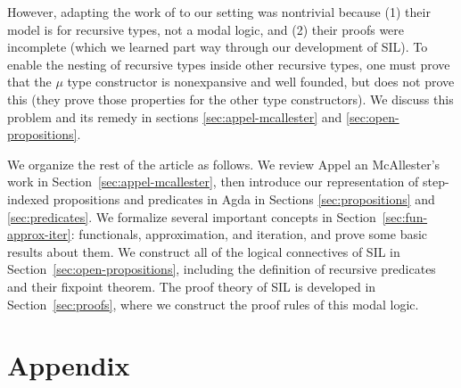 \documentclass[acmsmall]{acmart}
\begin{document}
However, adapting the work of \citet{Appel:2001aa} to our setting was
nontrivial because (1) their model is for recursive types, not a modal
logic, and (2) their proofs were incomplete (which we learned part way
through our development of SIL). To enable the nesting of recursive
types inside other recursive types, one must prove that the $μ$ type
constructor is nonexpansive and well founded, but \citet{Appel:2001aa}
does not prove this (they prove those properties for the other type
constructors).  We discuss this problem and its remedy in sections
\ref{sec:appel-mcallester} and \ref{sec:open-propositions}.

We organize the rest of the article as follows. We review Appel an
McAllester's work in Section~\ref{sec:appel-mcallester}, then
introduce our representation of step-indexed propositions and
predicates in Agda in Sections \ref{sec:propositions} and
\ref{sec:predicates}.  We formalize several important concepts in
Section~\ref{sec:fun-approx-iter}: functionals, approximation, and
iteration, and prove some basic results about them.  We construct all
of the logical connectives of SIL in
Section~\ref{sec:open-propositions}, including the definition of
recursive predicates and their fixpoint theorem.  The proof theory of
SIL is developed in Section~\ref{sec:proofs}, where we construct the
proof rules of this modal logic.





% 





\appendix
{}
\section*{Appendix}
\end{document}
